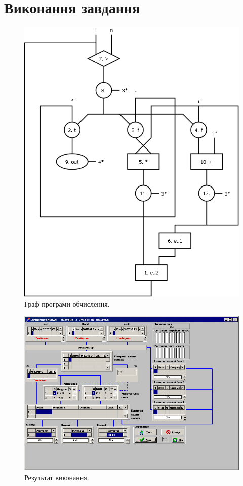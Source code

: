 \documentclass[a4paper, 10pt]{article}
\begin{document}
\section{Виконання завдання}
\begin{figure}[H]
\begin{center}
\includegraphics[scale=0.5, angle=90]{lab4_alg.png}
\caption{Граф програми обчислення.}
\end{center}
\end{figure}

\begin{figure}[H]
\begin{center}
\includegraphics[scale=0.75]{lab4.png}
\caption{Результат виконання.}
\end{center}
\end{figure}
\end{document}
